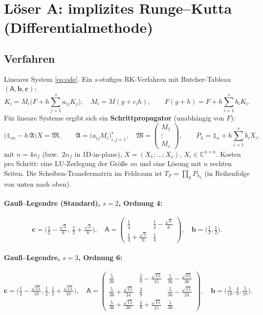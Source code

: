\section{Löser A: implizites Runge--Kutta (Differentialmethode)}\label{sec:rk}

\subsection{Verfahren}
Lineares System \eqref{eq:ode}. Ein $s$-stufiges RK-Verfahren mit Butcher-Tableau $(\mathsf A,\mathbf b,\mathbf c)$:
\begin{equation}
  K_i=M_i\Big(F+h\sum_{j=1}^{s}a_{ij}K_j\Big),\quad M_i=M(y+c_ih),\qquad
  F(y+h)=F+h\sum_{i=1}^{s}b_iK_i .
  \label{eq:rk}
\end{equation}
Für lineare Systeme ergibt sich ein \textbf{Schrittpropagator} (unabhängig von $F$):
\begin{equation}
  \big(\mathbb 1_{sn}-h\,\mathfrak A\big)X=\mathfrak M,\qquad
  \mathfrak A=\big(a_{ij}M_i\big)_{i,j=1}^{s},\quad \mathfrak M=\begin{pmatrix}M_1\\\vdots\\M_s\end{pmatrix},\qquad
  P_h=\mathbb 1_n+h\sum_{i=1}^{s}b_iX_i ,
  \label{eq:rkprop}
\end{equation}
mit $n=4n_f$ (bzw.\ $2n_f$ in 1D-in-plane), $X=(X_1;\dots;X_s)$, $X_i\in\mathbb C^{n\times n}$. Kosten pro
Schritt: eine LU-Zerlegung der Größe $sn$ und eine Lösung mit $n$ rechten Seiten.
Die Scheiben-Transfermatrix im Feldraum ist $T_F=\prod_kP_{h_k}$ (in Reihenfolge von unten nach oben).

\paragraph{Gauß--Legendre (Standard), $s=2$, Ordnung 4:}
\[
  \mathbf c=\Big(\tfrac12-\tfrac{\sqrt3}6,\ \tfrac12+\tfrac{\sqrt3}6\Big),\quad
  \mathsf A=\begin{pmatrix}\tfrac14&\tfrac14-\tfrac{\sqrt3}6\\\tfrac14+\tfrac{\sqrt3}6&\tfrac14\end{pmatrix},\quad
  \mathbf b=\big(\tfrac12,\tfrac12\big).
\]
\paragraph{Gauß--Legendre, $s=3$, Ordnung 6:}
\[
  \mathbf c=\Big(\tfrac12-\tfrac{\sqrt{15}}{10},\tfrac12,\tfrac12+\tfrac{\sqrt{15}}{10}\Big),\quad
  \mathsf A=\begin{pmatrix}\tfrac5{36}&\tfrac29-\tfrac{\sqrt{15}}{15}&\tfrac5{36}-\tfrac{\sqrt{15}}{30}\\
  \tfrac5{36}+\tfrac{\sqrt{15}}{24}&\tfrac29&\tfrac5{36}-\tfrac{\sqrt{15}}{24}\\
  \tfrac5{36}+\tfrac{\sqrt{15}}{30}&\tfrac29+\tfrac{\sqrt{15}}{15}&\tfrac5{36}\end{pmatrix},\quad
  \mathbf b=\big(\tfrac5{18},\tfrac49,\tfrac5{18}\big).
\]
